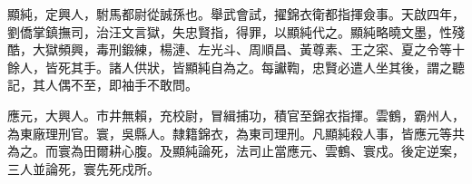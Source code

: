 \begin{pinyinscope}
顯純，定興人，駙馬都尉從誠孫也。舉武會試，擢錦衣衛都指揮僉事。天啟四年，劉僑掌鎮撫司，治汪文言獄，失忠賢指，得罪，以顯純代之。顯純略曉文墨，性殘酷，大獄頻興，毒刑鍛練，楊漣、左光斗、周順昌、黃尊素、王之寀、夏之令等十餘人，皆死其手。諸人供狀，皆顯純自為之。每讞鞫，忠賢必遣人坐其後，謂之聽記，其人偶不至，即袖手不敢問。

應元，大興人。市井無賴，充校尉，冒緝捕功，積官至錦衣指揮。雲鶴，霸州人，為東廠理刑官。寰，吳縣人。隸籍錦衣，為東司理刑。凡顯純殺人事，皆應元等共為之。而寰為田爾耕心腹。及顯純論死，法司止當應元、雲鶴、寰戍。後定逆案，三人並論死，寰先死戍所。


\end{pinyinscope}
